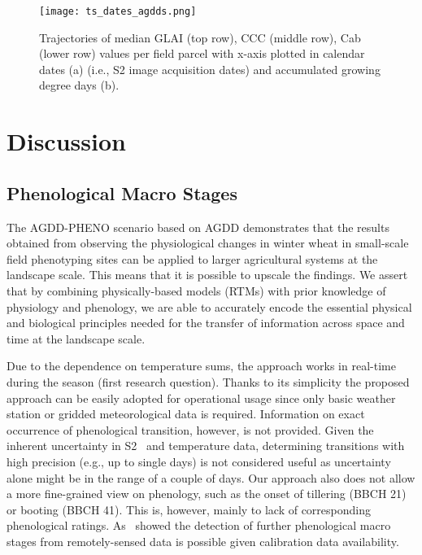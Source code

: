 \begin{figure}[H]
    \centering
    \texttt{[image: ts\_dates\_agdds.png]}
    \caption[Trajectories of median \gls{GLAI} (top row), \gls{CCC} (middle row), \gls{Cab} (lower row) values per field parcel with x-axis plotted in calendar dates (a) (i.e., \gls{S2} image acquisition dates) and accumulated growing degree days (b).]{Trajectories of median \gls{GLAI} (top row), \gls{CCC} (middle row), \gls{Cab} (lower row) values per field parcel with x-axis plotted in calendar dates (a) (i.e., \gls{S2} image acquisition dates) and accumulated growing degree days (b).}
    \label{fig:ts-dates-agdds}
\end{figure}

\section{Discussion}
\label{sec:insights_discussion}
% 
\subsection{Phenological Macro Stages}
The AGDD-PHENO scenario based on AGDD demonstrates that the results obtained from observing the physiological changes in winter wheat in small-scale field phenotyping sites can be applied to larger agricultural systems at the landscape scale. This means that it is possible to upscale the findings. We assert that by combining physically-based models (RTMs) with prior knowledge of physiology and phenology, we are able to accurately encode the essential physical and biological principles needed for the transfer of information across space and time at the landscape scale.

Due to the dependence on temperature sums, the approach works in real-time during the season (first research question). Thanks to its simplicity the proposed approach can be easily adopted for operational usage since only basic weather station or gridded meteorological data is required. Information on exact occurrence of phenological transition, however, is not provided. Given the inherent uncertainty in S2~\citep{graf_propagating_2023} and temperature data, determining transitions with high precision (e.g., up to single days) is not considered useful as uncertainty alone might be in the range of a couple of days. Our approach also does not allow a more fine-grained view on phenology, such as the onset of tillering (BBCH 21) or booting (BBCH 41). This is, however, mainly to lack of corresponding phenological ratings. As~\citep{liao_near_2023} showed the detection of further phenological macro stages from remotely-sensed data is possible given calibration data availability.

